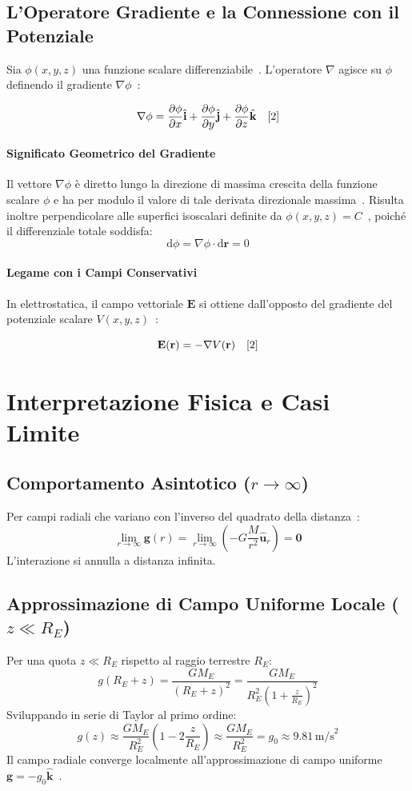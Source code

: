 \documentclass[12pt, a4paper]{article}
\begin{document}
\subsection{L'Operatore Gradiente e la Connessione con il Potenziale}

Sia $\phi(x,y,z)$ una funzione scalare differenziabile~\cite{2}. L'operatore $\nabla$ agisce su $\phi$ definendo il gradiente $\nabla \phi$~\cite{2}:

\[
\nabla \phi = \frac{\partial \phi}{\partial x} \hat{\mathbf{i}} + \frac{\partial \phi}{\partial y} \hat{\mathbf{j}} + \frac{\partial \phi}{\partial z} \hat{\mathbf{k}} \quad \text{\cite{2}}
\]

\paragraph{Significato Geometrico del Gradiente}
Il vettore $\nabla \phi$ è diretto lungo la direzione di massima crescita della funzione scalare $\phi$ e ha per modulo il valore di tale derivata direzionale massima~\cite{2}. Risulta inoltre perpendicolare alle superfici isoscalari definite da $\phi(x,y,z) = C$~\cite{2}, poiché il differenziale totale soddisfa:
\[
\text{d}\phi = \nabla \phi \cdot \text{d}\mathbf{r} = 0
\]

\paragraph{Legame con i Campi Conservativi}
In elettrostatica, il campo vettoriale $\mathbf{E}$ si ottiene dall'opposto del gradiente del potenziale scalare $V(x,y,z)$~\cite{2}:

\[
\mathbf{E}(\mathbf{r}) = - \nabla V(\mathbf{r}) \quad \text{\cite{2}}
\]

\section{Interpretazione Fisica e Casi Limite}

\subsection{Comportamento Asintotico ($r \to \infty$)}
Per campi radiali che variano con l'inverso del quadrato della distanza~\cite{1, 2}:
\[
\lim_{r \to \infty} \mathbf{g}(r) = \lim_{r \to \infty} \left( -G \frac{M}{r^2} \hat{\mathbf{u}}_r \right) = \mathbf{0}
\]
L'interazione si annulla a distanza infinita.

\subsection{Approssimazione di Campo Uniforme Locale ($z \ll R_E$)}
Per una quota $z \ll R_E$ rispetto al raggio terrestre $R_E$:
\[
g(R_E + z) = \frac{G M_E}{(R_E + z)^2} = \frac{G M_E}{R_E^2 \left(1 + \frac{z}{R_E}\right)^2}
\]
Sviluppando in serie di Taylor al primo ordine:
\[
g(z) \approx \frac{G M_E}{R_E^2} \left( 1 - 2\frac{z}{R_E} \right) \approx \frac{G M_E}{R_E^2} = g_0 \approx 9.81 \, \text{m/s}^2
\]
Il campo radiale converge localmente all'approssimazione di campo uniforme $\mathbf{g} = - g_0 \hat{\mathbf{k}}$~\cite{2}.
\end{document}
